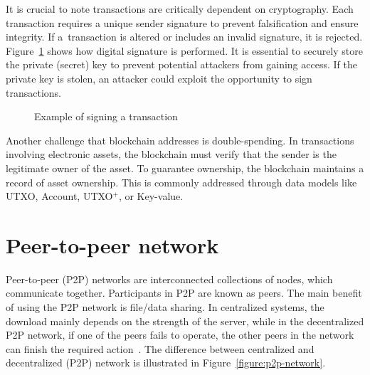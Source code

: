 It is crucial to note transactions are critically dependent on cryptography. Each transaction requires a unique sender signature to prevent falsification and ensure integrity. If a~transaction is altered or includes an invalid signature, it is rejected. Figure~\ref{figure:digital.signature} shows how digital signature is performed. It is essential to securely store the private (secret) key to prevent potential attackers from gaining access. If the private key is stolen, an attacker could exploit the opportunity to sign transactions.

\begin{figure}[h]
    \begin{center}
    \end{center}
    \caption{Example of signing a transaction}
    \label{figure:digital.signature}
\end{figure}

Another challenge that blockchain addresses is double-spending. In transactions involving electronic assets, the blockchain must verify that the sender is the legitimate owner of the asset. To guarantee ownership, the blockchain maintains a record of asset ownership. This is commonly addressed through data models like UTXO, Account, UTXO$^+$, or Key-value.



\section{Peer-to-peer network}
\label{section: P2P}

Peer-to-peer (P2P) networks are interconnected collections of nodes, which communicate together. Participants in P2P are known as peers. The main benefit of using the P2P network is file/data sharing. In centralized systems, the download mainly depends on the strength of the server, while in the decentralized P2P network, if one of the peers fails to operate, the other peers in the network can finish the required action~\cite{comprehensive.survey.blockchain}. The difference between centralized and decentralized (P2P) network is illustrated in Figure~\ref{figure:p2p-network}.


